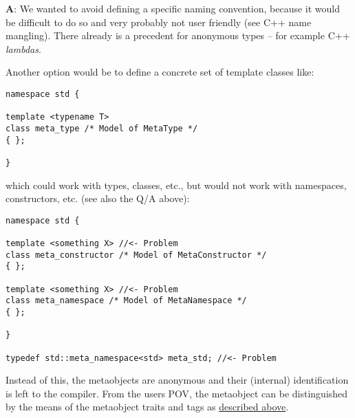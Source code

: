 {\textbf A:} We wanted to avoid defining a specific naming convention, because it would
be difficult to do so and very probably not user friendly (see C++ name mangling). There
already is a precedent for anonymous types -- for example C++ {\em lambdas}.

Another option would be to define a concrete set of template classes like:

\begin{verbatim}
namespace std {

template <typename T>
class meta_type /* Model of MetaType */
{ };

}
\end{verbatim}

which could work with types, classes, etc., but would not work with namespaces, constructors,
etc. (see also the Q/A above):

\begin{verbatim}
namespace std {

template <something X> //<- Problem
class meta_constructor /* Model of MetaConstructor */
{ };

template <something X> //<- Problem
class meta_namespace /* Model of MetaNamespace */
{ };

}

typedef std::meta_namespace<std> meta_std; //<- Problem
\end{verbatim}

Instead of this, the metaobjects are anonymous and their (internal) identification
is left to the compiler. From the users POV, the metaobject can be distinguished
by the means of the metaobject traits and tags as \hyperref[section-Concepts]{described above}.
